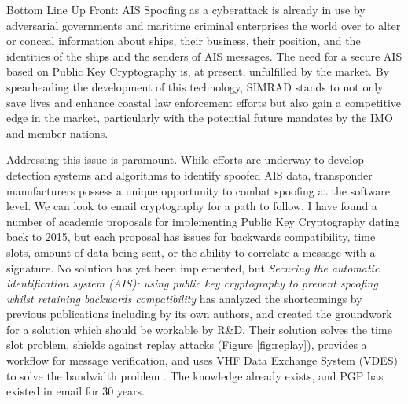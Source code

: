 \documentclass[12pt]{texMemo} %
\begin{document}
\maketitle
Bottom Line Up Front: AIS Spoofing as a cyberattack is already in use by adversarial governments and maritime criminal enterprises the world over to alter or conceal information about ships, their business, their position, and the identities of the ships and the senders of AIS messages. The need for a secure AIS based on Public Key Cryptography is, at present, unfulfilled by the market. By spearheading the development of this technology, SIMRAD stands to not only save lives and enhance coastal law enforcement efforts but also gain a competitive edge in the market, particularly with the potential future mandates by the IMO and member nations. 




Addressing this issue is paramount. While efforts are underway to develop detection systems and algorithms to identify spoofed AIS data, transponder manufacturers possess a unique opportunity to combat spoofing at the software level. We can look to email cryptography for a path to follow. I have found a number of academic proposals for implementing Public Key Cryptography dating back to 2015, but each proposal has issues for backwards compatibility, time slots, amount of data being sent, or the ability to correlate a message with a signature. No solution has yet been implemented, but \textit{Securing the automatic identification system (AIS): using public key cryptography to prevent spoofing whilst retaining backwards compatibility} has analyzed the shortcomings by previous publications including by its own authors, and created the groundwork for a solution which should be workable by R\&D. Their solution solves the time slot problem, shields against replay attacks (Figure \ref{fig:replay}), provides a workflow for message verification, and uses VHF Data Exchange System (VDES) to solve the bandwidth problem \parencite[]{wimpenny_securing_2022}. The knowledge already exists, and PGP has existed in email for 30 years. 
\end{document}
